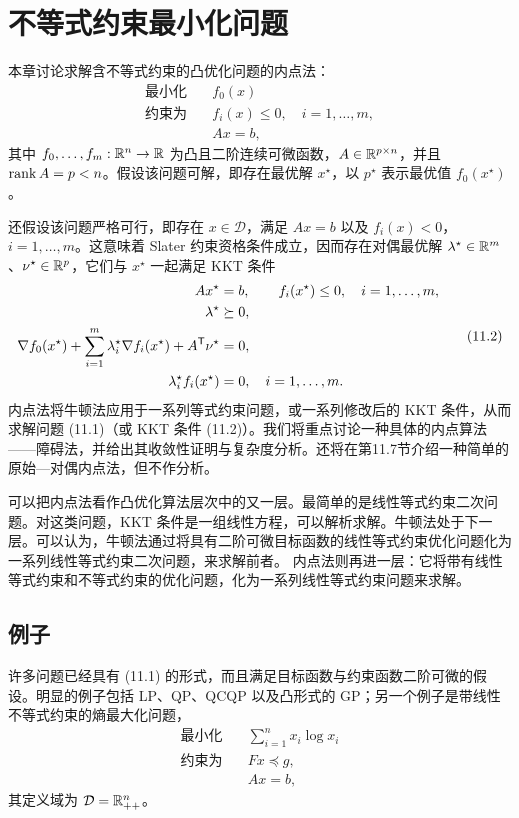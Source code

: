 \section{不等式约束最小化问题}
本章讨论求解含不等式约束的凸优化问题的内点法：
\begin{equation}\begin{aligned}
\text{最小化}\quad &f_0(x)\\
\text{约束为}\quad &f_i(x)\le0,\quad i=1,\ldots,m,\\
&Ax=b,
\end{aligned}\tag{11.1}\end{equation}
其中 $f_0,\ldots,f_m:\mathbb R^n\to\mathbb R$ 为凸且二阶连续可微函数，$A\in\mathbb R^{p\times n}$，并且 $\operatorname{rank} A=p<n$。假设该问题可解，即存在最优解 $x^\star$，以 $p^\star$ 表示最优值 $f_0(x^\star)$。

还假设该问题严格可行，即存在 $x\in\mathcal D$，满足 $Ax=b$ 以及 $f_i(x)<0$，$i=1,\ldots,m$。这意味着 Slater 约束资格条件成立，因而存在对偶最优解 $\lambda^\star\in\mathbb R^m$、$\nu^\star\in\mathbb R^p$，它们与 $x^\star$ 一起满足 KKT 条件
\begin{equation}\begin{aligned}
Ax^\star&=b,\qquad f_i(x^\star)\le0,\quad i=1,\ldots,m,\\
\lambda^\star&\succeq0,\\
\nabla f_0(x^\star)+\sum_{i=1}^m\lambda_i^\star\nabla f_i(x^\star)+A^\mathsf T\nu^\star&=0,\\
\lambda_i^\star f_i(x^\star)&=0,\quad i=1,\ldots,m.
\end{aligned}\tag{11.2}\end{equation}
内点法将牛顿法应用于一系列等式约束问题，或一系列修改后的 KKT 条件，从而求解问题 (11.1)（或 KKT 条件 (11.2)）。我们将重点讨论一种具体的内点算法——障碍法，并给出其收敛性证明与复杂度分析。还将在第11.7节介绍一种简单的原始—对偶内点法，但不作分析。

可以把内点法看作凸优化算法层次中的又一层。最简单的是线性等式约束二次问题。对这类问题，KKT 条件是一组线性方程，可以解析求解。牛顿法处于下一层。可以认为，牛顿法通过将具有二阶可微目标函数的线性等式约束优化问题化为一系列线性等式约束二次问题，来求解前者。
内点法则再进一层：它将带有线性等式约束和不等式约束的优化问题，化为一系列线性等式约束问题来求解。

\subsection*{例子}
许多问题已经具有 (11.1) 的形式，而且满足目标函数与约束函数二阶可微的假设。明显的例子包括 LP、QP、QCQP 以及凸形式的 GP；另一个例子是带线性不等式约束的熵最大化问题，
\[
\begin{aligned}
\text{最小化}\quad&\sum_{i=1}^n x_i\log x_i\\
\text{约束为}\quad&Fx\preceq g,\\
&Ax=b,
\end{aligned}
\]
其定义域为 $\mathcal D=\mathbb R_{++}^n$。

